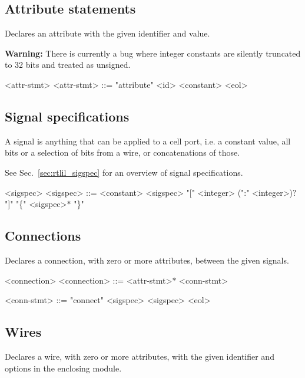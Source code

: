 \subsection{Attribute statements}

Declares an attribute with the given identifier and value.

\textbf{Warning:} There is currently a bug where integer constants are silently truncated to 32 bits and treated as unsigned.

\begin{indentgrammar}{<attr-stmt>}
<attr-stmt> ::= "attribute" <id> <constant> <eol>
\end{indentgrammar}

\subsection{Signal specifications}

A signal is anything that can be applied to a cell port, i.e. a constant value, all bits or a selection of bits from a wire, or concatenations of those.

See Sec.~\ref{sec:rtlil_sigspec} for an overview of signal specifications.

\begin{indentgrammar}{<sigspec>}
<sigspec> ::=
<constant>
    \alt <sigspec> "[" <integer> (":" <integer>)$?$ "]"
    \alt "\{" <sigspec>$*$ "\}"
\end{indentgrammar}

\subsection{Connections}

Declares a connection, with zero or more attributes, between the given signals.

\begin{indentgrammar}{<connection>}
<connection> ::= <attr-stmt>$*$ <conn-stmt>

<conn-stmt> ::= "connect" <sigspec> <sigspec> <eol>
\end{indentgrammar}

\subsection{Wires}

Declares a wire, with zero or more attributes, with the given identifier and options in the enclosing module.

